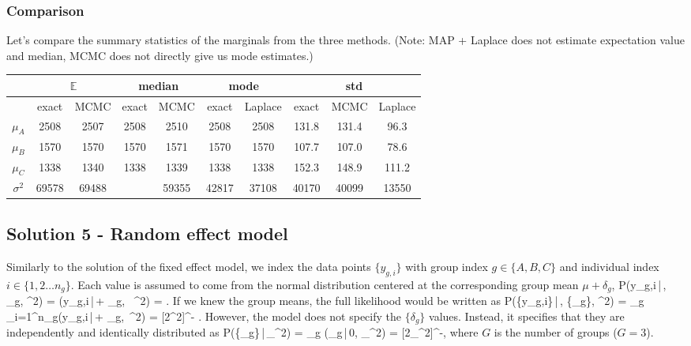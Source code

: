 \documentclass[10pt,oneside]{article}
\begin{document}
\subsubsection*{Comparison}
Let's compare the summary statistics of the marginals from the three methods. (Note: MAP + Laplace does not estimate expectation value and median, MCMC does not directly give us mode estimates.)
\begin{table}[h]
\centering
\begin{tabular}{c|cc|cc|cc|ccc}
		& \multicolumn{2}{c|}{$\mathbb{E}$} 
		& \multicolumn{2}{c|}{median} 
		& \multicolumn{2}{c|}{mode} 
		& \multicolumn{3}{c}{std} \\
		\hline
		& exact & MCMC
		& exact & MCMC
		& exact & Laplace
		& exact & MCMC & Laplace\\
		\hline
	$\mu_A$ 
	& 2508 & 2507 
	& 2508 & 2510 
	& 2508 & 2508 
	& 131.8 & 131.4 & 96.3 
	\\
	$\mu_B$ 
	& 1570 & 1570 
	& 1570 & 1571 
	& 1570 & 1570 
	& 107.7 & 107.0 & 78.6
	\\
	$\mu_C$ 
	& 1338 & 1340 
	& 1338 & 1339 
	& 1338 & 1338 
	& 152.3 & 148.9 & 111.2
	\\
	$\sigma^2$ 
	& 69578 & 69488 
	&  & 59355 
	& 42817 & 37108 
	& 40170 & 40099 & 13550
	\\
	\hline
\end{tabular}
\end{table}


\newpage
\subsection*{Solution 5 - Random effect model}
Similarly to the solution of the fixed effect model, we index the data points $\{y_{g,i}\}$ with group index $g\in\{A,B,C\}$ and individual index $i\in\{1,2\ldots n_g\}$. Each value is assumed to come from the normal distribution centered at the corresponding group mean $\mu + \delta_g$, 
\be
	P(y_{g,i}\,|\,\mu, \delta_g, \sigma^2) = (y_{g,i}\,|\,\mu + \delta_g, \, \sigma^2) = \exp{}.
\ee
If we knew the group means, the full likelihood would be written as 
\be
	P(\{y_{g,i}\}\,|\,\mu, \{\delta_g\}, \sigma^2) = \prod_g \prod_{i=1}^{n_g}(y_{g,i}\,|\,\mu + \delta_g,\, \sigma^2) = [2\pi\sigma^2]^{-} \exp\left[-\frac{1}{2\sigma^2}\sum_g\sum_{i=1}^{n_g}(y_{g,i} - (\mu + \delta_g))^2\right].
\ee
However, the model does not specify the $\{\delta_g\}$ values. Instead, it specifies that they are independently and identically distributed as
\be
	P(\{\delta_g\}\,|\,\sigma_\delta^2) = \prod_g (\delta_g\,|\,0, \sigma_\delta^2) = [2\pi\sigma_\delta^2]^{-}\exp{},
\ee
where $G$ is the number of groups ($G=3$).
\end{document}
